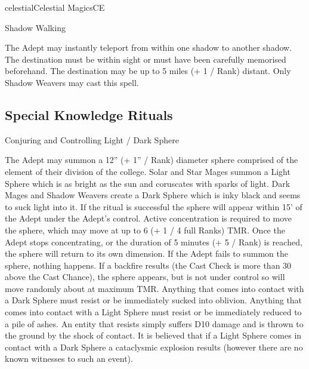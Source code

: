 \begin{college}[1.3]{celestial}{Celestial Magics}{CE}
\begin{spell}[S-10 Shadow]{Shadow Walking}
\begin{effects}
The Adept may instantly teleport from within one shadow to another
shadow.  The destination must be within sight or must have been
carefully memorised beforehand.  The destination may be up to 5 miles
(+ 1 / Rank) distant.  Only Shadow Weavers may cast this spell.
\end{effects}
\end{spell}

\subsection{Special Knowledge Rituals}

\begin{ritual}[R-1]{Conjuring and Controlling Light / Dark Sphere}

\begin{effects}
The Adept may summon a 12'' (+ 1'' / Rank) diameter sphere comprised
of the element of their division of the college.  Solar and Star Mages
summon a Light Sphere which is as bright as the sun and coruscates
with sparks of light.  Dark Mages and Shadow Weavers create a Dark
Sphere which is inky black and seems to suck light into it.  If the
ritual is successful the sphere will appear within 15' of the Adept
under the Adept's control.  Active concentration is required to move
the sphere, which may move at up to 6 (+ 1 / 4 full Ranks) TMR.  Once
the Adept stops concentrating, or the duration of 5 minutes (+ 5 /
Rank) is reached, the sphere will return to its own dimension.  If the
Adept fails to summon the sphere, nothing happens.  If a backfire
results (the Cast Check is more than 30 above the Cast Chance), the
sphere appears, but is not under control so will move randomly about
at maximum TMR.  Anything that comes into contact with a Dark Sphere
must resist or be immediately sucked into oblivion.  Anything that
comes into contact with a Light Sphere must resist or be immediately
reduced to a pile of ashes.  An entity that resists simply suffers D10
damage and is thrown to the ground by the shock of contact.  It is
believed that if a Light Sphere comes in contact with a Dark Sphere a
cataclysmic explosion results (however there are no known witnesses to
such an event).
\end{effects}
\end{ritual}


\end{college}
